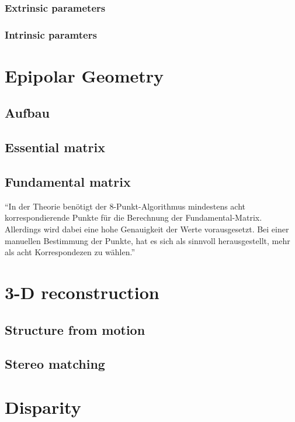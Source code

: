 \subsubsection{Extrinsic parameters}
\subsubsection{Intrinsic paramters}

\section{Epipolar Geometry}
\subsection{Aufbau}
\subsection{Essential matrix}
\subsection{Fundamental matrix}
\enquote{In der Theorie benötigt der 8-Punkt-Algorithmus mindestens acht korrespondierende Punkte für die Berechnung der Fundamental-Matrix. Allerdings wird dabei eine hohe Genauigkeit der Werte vorausgesetzt. Bei einer manuellen Bestimmung der Punkte, hat es sich als sinnvoll herausgestellt, mehr als acht Korrespondezen zu wählen.}


\section{3-D reconstruction}

\subsection{Structure from motion}\label{ssec:SfM}
\subsection{Stereo matching}\label{ssec:stereoMatch}
 
\section{Disparity}

